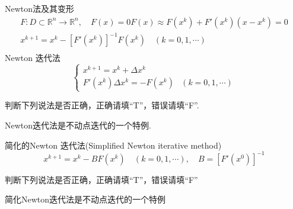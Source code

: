 \begin{note}
    Newton法及其变形
    \[
        \begin{array}{l}
            F{:}D\subset\mathbb{R}^n\to\mathbb{R}^n,\quad F(x)=0
            F(x)\approx F(x^k)+F'(x^k)(x-x^k)=0\\
            x^{k+1}=x^k-[F'(x^k)]^{-1}F(x^k)\quad(k=0,1,\cdots)\\
        \end{array}
    \]
    Newton 迭代法
    \[
        \begin{cases}x^{k+1}=x^k+\Delta x^k\\F'(x^k)\Delta x^k=-F(x^k)&(k=0,1,\cdots)\end{cases}
    \]
\end{note}
\begin{example}
    判断下列说法是否正确，正确请填“T”，错误请填“F”.
    
    Newton迭代法是不动点迭代的一个特例.
\end{example}
\begin{note}
    简化的Newton 迭代法(Simplified Newton iterative method)
    \[
        x^{k+1}=x^k-BF(x^k)\quad(k=0,1,\cdots),\quad B=[F'(x^0)]^{-1}
    \]
\end{note}
\begin{example}
    判断下列说法是否正确，正确请填“T”，错误请填“F”
    
    简化Newton迭代法是不动点迭代的一个特例
\end{example}
